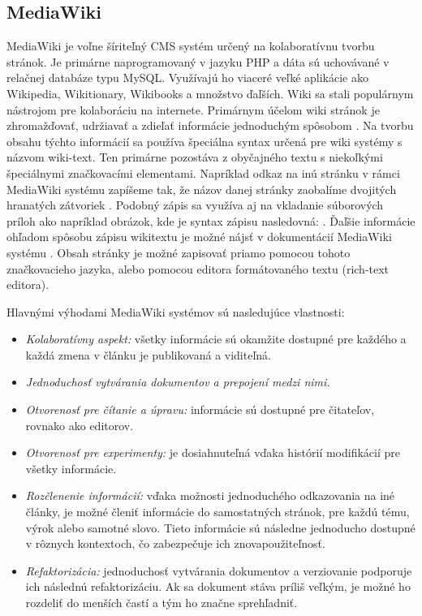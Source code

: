 \subsection{MediaWiki}
MediaWiki je voľne šíriteľný CMS systém určený na kolaboratívnu tvorbu stránok. Je primárne naprogramovaný v jazyku PHP a dáta sú uchovávané v relačnej databáze typu MySQL. Využívajú ho viaceré veľké aplikácie ako Wikipedia, Wikitionary, Wikibooks a množstvo ďaľších. 
Wiki sa stali populárnym nástrojom pre kolaboráciu na internete. Primárnym účelom wiki stránok je zhromažďovať, udržiavať a zdieľať informácie jednoduchým spôsobom \cite{krotzsch2006semantic}. Na tvorbu obsahu týchto informácií sa používa špeciálna syntax určená pre wiki systémy s názvom wiki-text. Ten primárne pozostáva z obyčajného textu s niekoľkými špeciálnymi značkovacími elementami. Napríklad odkaz na inú stránku v rámci MediaWiki systému zapíšeme tak, že názov danej stránky zaobalíme dvojitých hranatých zátvoriek . Podobný zápis sa využíva aj na vkladanie súborových príloh ako napríklad obrázok, kde je syntax zápisu nasledovná: . Ďaľšie informácie ohľadom spôsobu zápisu wikitextu je možné nájsť v dokumentácií MediaWiki systému \citep{MediaWikiHelpFormating}. Obsah stránky je možné zapisovať priamo pomocou tohoto značkovacieho jazyka, alebo pomocou editora formátovaného textu (rich-text editora).

Hlavnými výhodami MediaWiki systémov sú nasledujúce vlastnosti:
\begin{itemize}
	\item \textit{Kolaboratívny aspekt:} všetky informácie sú okamžite dostupné pre každého a každá zmena v článku je publikovaná a viditeľná.
	\item \textit{Jednoduchosť vytvárania dokumentov a prepojení medzi nimi.}
	\item \textit{Otvorenosť pre čítanie a úpravu:} informácie sú dostupné pre čitateľov, rovnako ako editorov.
	\item \textit{Otvorenosť pre experimenty:} je dosiahnuteľná vďaka histórií modifikácií pre všetky informácie.
	\item \textit{Rozčlenenie informácií:} vďaka možnosti jednoduchého odkazovania na iné články, je možné členiť informácie do samostatných stránok, pre každú tému, výrok alebo samotné slovo. Tieto informácie sú následne jednoducho dostupné v rôznych kontextoch, čo zabezpečuje ich znovapoužiteľnosť.
	\item \textit{Refaktorizácia:} jednoduchosť vytvárania dokumentov a verziovanie podporuje ich následnú refaktorizáciu. Ak sa dokument stáva príliš veľkým, je možné ho rozdeliť do menších častí a tým ho značne sprehľadniť.
\end{itemize}

